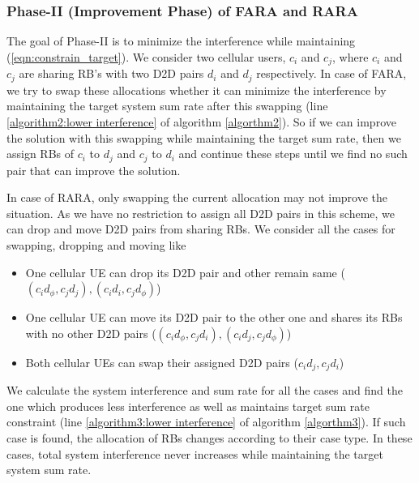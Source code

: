 \documentclass{ieeeaccess}
\begin{document}
\subsubsection{Phase-II (Improvement Phase) of FARA and RARA} \label{subsection:Improvement Phase (Phase-II)}
\smallskip
 
The goal of Phase-II is to minimize the interference while maintaining (\ref{eqn:constrain_target}). We consider two cellular users, $c_i$ and $c_j$, where $c_i$ and $c_j$ are sharing RB's with two D2D pairs $d_i$ and $d_j$ respectively. In case of FARA, we try to swap these allocations whether it can minimize the interference by maintaining the target system sum rate after this swapping (line \ref{algorithm2:lower interference} of algorithm \ref{algorthm2}). So if we can improve the solution with this swapping while maintaining the target sum rate, then we assign RBs of $c_i$ to $d_j$ and $c_j$ to $d_i$ and continue these steps until we find no such pair that can improve the solution.

\smallskip

In case of RARA, only swapping the current allocation may not improve the situation. As we have no restriction to assign all D2D pairs in this scheme, we can drop and move D2D pairs from sharing RBs. We consider all the cases for swapping, dropping and moving like 

\begin{itemize}
  \item One cellular UE can drop its D2D pair and other remain same ($(c_id_\phi,c_jd_j),(c_id_i,c_jd_\phi)$)
  \item One cellular UE can move its D2D pair to the other one and shares its RBs with no other D2D pairs ($(c_id_\phi,c_jd_i), (c_id_j,c_jd_\phi)$)
  \item Both cellular UEs can swap their assigned D2D pairs ($c_id_j,c_jd_i$)
\end{itemize}

\smallskip

We calculate the system interference and sum rate for all the cases and find the one which produces less interference as well as maintains target sum rate constraint (line \ref{algorithm3:lower interference} of algorithm \ref{algorthm3}). If such case is found, the allocation of RBs changes according to their case type. In these cases, total system interference never increases while maintaining the target system sum rate. 

\vspace{-0.1cm}
\end{document}
